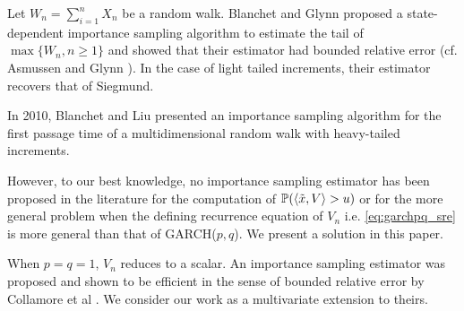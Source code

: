 \documentclass[aoas,preprint]{imsart}
\numberwithin{equation}{section}
\theoremstyle{plain}
\begin{document}
Let $W_n = \sum_{i=1}^n X_n$ be a random walk. Blanchet and Glynn
\cite{blanchet:glynn:2008}
proposed a state-dependent importance sampling algorithm to estimate
the tail of $\max\{W_n, n \geq 1\}$ and showed that their estimator
had bounded relative error (cf. Asmussen and Glynn
\cite{opac-b1123521}). In the case of light tailed increments, their
estimator recovers that of Siegmund.

In 2010, Blanchet and Liu \cite{blanchet:liu:2010} presented an
importance sampling algorithm for the first passage time of a
multidimensional random walk with heavy-tailed increments.

However, to our best knowledge, no importance sampling
estimator has been proposed in the literature for the computation of
$\mathbb{P}(\langle\tilde x, V\rangle > u)$ or for the more general problem when the
defining recurrence equation of $V_n$ i.e. \eqref{eq:garchpq_sre} is 
more general than that of GARCH($p, q$). We present a solution in this
paper.

When $p = q = 1$, $V_n$ reduces to a scalar. An importance sampling
estimator was proposed and shown to be efficient in the sense of
bounded relative error by Collamore et al \cite{collamore2014}. We
consider our work as a multivariate extension to theirs.
\end{document}
